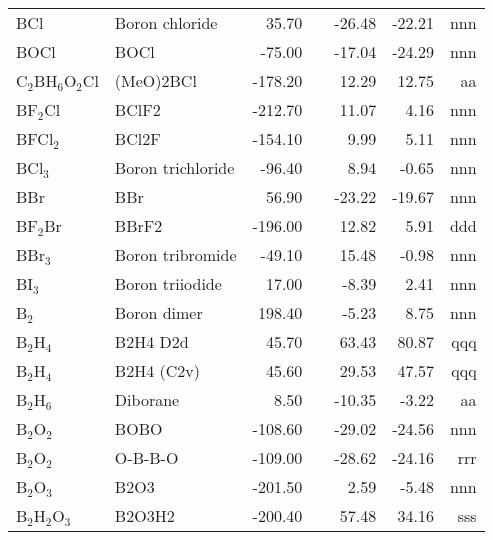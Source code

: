 \begin{table}
\begin{center}
\begin{tabular}{llrrrrr}
 BCl         & Boron chloride                        &    35.70    &  &   -26.48  &   -22.21  &    nnn\\
 BOCl        & BOCl                                  &   -75.00    &  &   -17.04  &   -24.29  &    nnn\\
 C$_2$BH$_6$O$_2$Cl   & (MeO)2BCl                             &  -178.20    &  &    12.29  &    12.75  &     aa\\
 BF$_2$Cl       & BClF2                                 &  -212.70    &  &    11.07  &     4.16  &    nnn\\
 BFCl$_2$       & BCl2F                                 &  -154.10    &  &     9.99  &     5.11  &    nnn\\
 BCl$_3$        & Boron trichloride                     &   -96.40    &  &     8.94  &    -0.65  &    nnn\\
 BBr         & BBr                                   &    56.90    &  &   -23.22  &   -19.67  &    nnn\\
 BF$_2$Br       & BBrF2                                 &  -196.00    &  &    12.82  &     5.91  &    ddd\\
 BBr$_3$        & Boron tribromide                      &   -49.10    &  &    15.48  &    -0.98  &    nnn\\
 BI$_3$         & Boron triiodide                       &    17.00    &  &    -8.39  &     2.41  &    nnn\\
 B$_2$          & Boron dimer                           &   198.40    &  &    -5.23  &     8.75  &    nnn\\
 B$_2$H$_4$        & B2H4 D2d                              &    45.70    &  &    63.43  &    80.87  &    qqq\\
 B$_2$H$_4$        & B2H4 (C2v)                            &    45.60    &  &    29.53  &    47.57  &    qqq\\
 B$_2$H$_6$        & Diborane                              &     8.50    &  &   -10.35  &    -3.22  &     aa\\
 B$_2$O$_2$        & BOBO                                  &  -108.60    &  &   -29.02  &   -24.56  &    nnn\\
 B$_2$O$_2$        & O-B-B-O                               &  -109.00    &  &   -28.62  &   -24.16  &    rrr\\
 B$_2$O$_3$        & B2O3                                  &  -201.50    &  &     2.59  &    -5.48  &    nnn\\
 B$_2$H$_2$O$_3$      & B2O3H2                                &  -200.40    &  &    57.48  &    34.16  &    sss\\

\end{tabular}
\end{center}
\end{table}
